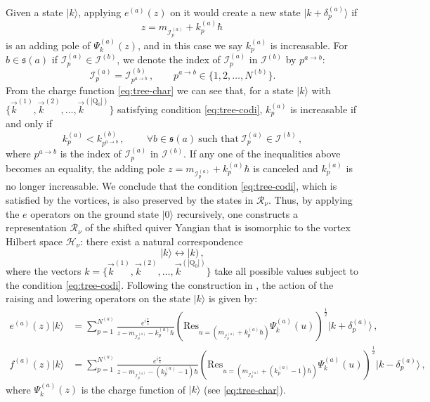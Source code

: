 \documentclass[12pt,a4paper]{article}
\renewcommand{\(}{\left(}
\renewcommand{\)}{\right)}
\renewcommand{\(}{\left(}
\renewcommand{\)}{\right)}
\begin{document}
Given a state $|k\rangle$, applying $e^{(a)}(z)$ on it would create a new state $|k+\delta^{(a)}_{p}\rangle$ if
\begin{equation}
z=m_{\mathcal{I}^{(a)}_{p}}+k^{(a)}_{p}\hbar\,
\end{equation} is an adding pole of $\Psi^{(a)}_k(z)$, and in this case we say $k^{(a)}_{p}$ is increasable. 
For $b\in \mathfrak{s}(a)$ if $\mathcal{I}^{(a)}_{p}\in \mathcal{I}^{(b)}$, we denote the index of $\mathcal{I}^{(a)}_{p}$ in $\mathcal{I}^{(b)}$ by $p^{a\to b}$:
\begin{equation}
\mathcal{I}^{(a)}_{p}=\mathcal{I}^{(b)}_{p^{a\to b}}\,,\qquad p^{a\to b}\in\{1,2,\dots,N^{(b)}\}.
\end{equation}
From the charge function \eqref{eq:tree-char} we can see that, for a state $|k\rangle$ with $\{\vec{k}^{(1)},\vec{k}^{(2)},\dots,\vec{k}^{(|\mathrm{Q}_0|)}\}$ satisfying condition \eqref{eq:tree-codi}, $k^{(a)}_{p}$ is increasable if and only if 
\begin{equation}
k^{(a)}_{p}<k^{(b)}_{p^{a\to b}}\,,\ \qquad\forall b \in \mathfrak{s}(a)\ \text{such that}\ \mathcal{I}^{(a)}_{p}\in \mathcal{I}^{(b)}\,,
\end{equation}
where $p^{a\to b}$ is the index of $\mathcal{I}^{(a)}_{p}$ in $\mathcal{I}^{(b)}$. 
If any one of the inequalities above becomes an equality, the adding pole $z=m_{\mathcal{I}^{(a)}_{p}}+k^{(a)}_{p}\hbar$ is canceled and $k^{(a)}_p$ is no longer increasable. 
We conclude that the condition \eqref{eq:tree-codi}, which is satisfied by the vortices, is also preserved by the states in $\mathcal{R}_\nu$. 
Thus, by applying the $e$ operators on the ground state $|0\rangle$ recursively, one constructs a representation $\mathcal{R}_\nu$ of the shifted quiver Yangian that is isomorphic to the vortex Hilbert space $\mathcal{H}_{\nu}$: there exist a natural correspondence
\begin{equation}\label{eq:|k>|k)}
|k\rangle\longleftrightarrow|k)\,,
\end{equation}
where the vectors $k=\{\vec{k}^{(1)},\vec{k}^{(2)},\dots,\vec{k}^{(|\textrm{Q}_0|)}\}$ take all possible values subject to the condition \eqref{eq:tree-codi}.
Following the construction in \cite{Li:2023zub}, the action of the raising and lowering operators on the state $|k\rangle$ is given by:
\begin{align}
e^{(a)}(z)|k\rangle&=\sum_{p=1}^{N^{(a)}}\frac{e^{i\frac{\pi}{4}}}{z-m_{\mathcal{I}^{(a)}_{p}}-k^{(a)}_p \hbar}\left(\mathrm{Res}_{u=(m_{\mathcal{I}^{(a)}_{p}}+k^{(a)}_{p}\hbar)}\Psi^{(a)}_k(u)\right)^{\frac{1}{2}}|k+\delta^{(a)}_{p}\rangle\,,\label{eq:e-action}\\
f^{(a)}(z)|k\rangle&=\sum_{p=1}^{N^{(a)}}\frac{e^{i\frac{\pi}{4}}}{z-m_{\mathcal{I}^{(a)}_{p}}-(k^{(a)}_{p}-1)\hbar}\left(\mathrm{Res}_{u=(m_{\mathcal{I}^{(a)}_{p}}+(k^{(a)}_{p}-1)\hbar)}\Psi^{(a)}_k(u)\right)^{\frac{1}{2}}|k-\delta^{(a)}_{p}\rangle\,,\label{eq:f-action}
\end{align}  
where $\Psi^{(a)}_k(z)$ is the charge function of $|k\rangle$ (see \eqref{eq:tree-char}).
\end{document}
